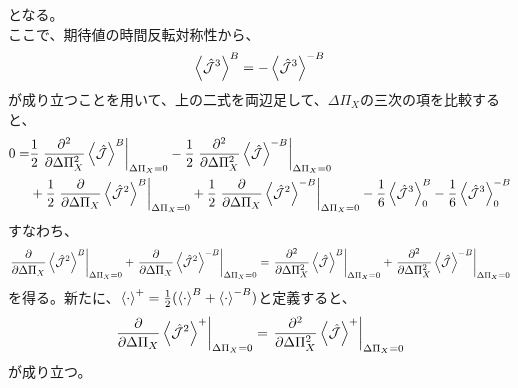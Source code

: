 \documentclass[a4paper,11pt]{jsarticle}
\begin{document}
となる。\\
ここで、期待値の時間反転対称性から、
\begin{align}
    \ev{\hat{\mathcal{J}}^3}^B = -\ev{\hat{\mathcal{J}}^3}^{-B}
\end{align}
が成り立つことを用いて、上の二式を両辺足して、$\Delta \Pi_X$の三次の項を比較すると、
\begin{align*}
    0=&\frac{1}{2}\left.\pdv[2]{\Delta \Pi_X} \ev{\hat{\mathcal{J}}}^B\right|_{\Delta \Pi_X = 0} - \frac{1}{2}\left.\pdv[2]{\Delta \Pi_X} \ev{\hat{\mathcal{J}}}^{-B}\right|_{\Delta \Pi_X = 0}\\
    &+\frac{1}{2} \left.\pdv{\Delta \Pi_X} \ev{\hat{\mathcal{J}}^2}^B\right|_{\Delta \Pi_X = 0} + \frac{1}{2}\left.\pdv{\Delta \Pi_X} \ev{\hat{\mathcal{J}}^2}^{-B}\right|_{\Delta \Pi_X = 0} -\frac{1}{6}\ev{\hat{\mathcal{J}}^3}^B_0 - \frac{1}{6}\ev{\hat{\mathcal{J}}^3}^{-B}_0\\
\end{align*}
すなわち、
\begin{align}
    \left.\pdv{\Delta \Pi_X} \ev{\hat{\mathcal{J}}^2}^B\right|_{\Delta \Pi_X = 0} + \left.\pdv{\Delta \Pi_X} \ev{\hat{\mathcal{J}}^2}^{-B}\right|_{\Delta \Pi_X = 0} = \left.\pdv[2]{\Delta \Pi_X} \ev{\hat{\mathcal{J}}}^B\right|_{\Delta \Pi_X = 0} + \left.\pdv[2]{\Delta \Pi_X} \ev{\hat{\mathcal{J}}}^{-B}\right|_{\Delta \Pi_X = 0}
\end{align}
を得る。新たに、$\ev{\cdot}^+ = \frac{1}{2}(\ev{\cdot}^B + \ev{\cdot}^{-B})$と定義すると、
\begin{align}
    \left.\pdv{\Delta \Pi_X} \ev{\hat{\mathcal{J}}^2}^+\right|_{\Delta \Pi_X = 0} = \left.\pdv[2]{\Delta \Pi_X} \ev{\hat{\mathcal{J}}}^+\right|_{\Delta \Pi_X = 0}
\end{align}
が成り立つ。\hfill \qedsymbol\\
\end{document}
